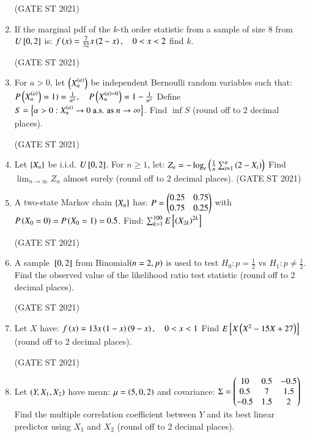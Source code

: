 \documentclass[journal,12pt,onecolumn]{IEEEtran}
\theoremstyle{remark}
\begin{document}
\begin{enumerate}
\hfill (GATE ST 2021) \\


\item
If the marginal pdf of the $k$-th order statistic from a sample of size 8 from $U{}\left[0,2\right]$ is:
$
f\left(x\right) = \frac{7}{32} x \left(2-x\right), \quad 0 < x < 2
$
find $k$.

\hfill (GATE ST 2021) \\

\item
For $a > 0$, let $\left( X_n^{\left(a\right)} \right)$ be independent Bernoulli random variables such that:
$
P\left(X_n^{\left(a\right)}\right) = 1) = \frac{1}{n^\alpha}, \quad P\left(X_n^{\left(a\right) = 0}\right) = 1 - \frac{1}{n^\alpha}
$
Define $S = \left\{ \alpha > 0 : X_n^{\left(a\right)} \to 0 \ \text{a.s. as} \ n \to \infty \right\}$.  
Find $\inf S$ (round off to 2 decimal places).

\hfill (GATE ST 2021) \\

\item
Let $\left\{X_n\right\}$ be i.i.d. $U{}\left[0,2\right]$. For $n \ge 1$, let:
$
Z_n = - \log_e \left( \frac{1}{n} \sum_{i=1}^n \left(2 - X_i\right) \right)
$
Find $\lim_{n \to \infty} Z_n$ almost surely (round off to 2 decimal places).
\hfill (GATE ST 2021) \\

\item
A two-state Markov chain $\left\{X_n\right\}$ has:
$
P = \begin{pmatrix} 0.25 & 0.75 \\ 0.75 & 0.25 \end{pmatrix}
$
with $P\left(X_0 = 0\right) = P\left(X_0 = 1\right) = 0.5$. Find:
$
\sum_{k=1}^{100} E{}\left[\left(X_{2k}\right)^{2k}\right]
$

\hfill (GATE ST 2021) \\

\item
A sample ${}\left[0,2\right]$ from Binomial$\left(n=2,p\right)$ is used to test $H_0: p = \frac12$ vs $H_1: p \ne \frac12$.  
Find the observed value of the likelihood ratio test statistic (round off to 2 decimal places).

\hfill (GATE ST 2021) \\

\item
Let $X$ have:
$
f\left(x\right) = 13x\left(1-x\right)\left(9-x\right), \quad 0 < x < 1
$
Find $E{}\left[ X\left(X^2 - 15X + 27\right)\right]$ (round off to 2 decimal places).

\hfill (GATE ST 2021) \\

\item
Let $\left(Y, X_1, X_2\right)$ have mean:
$
\mu = \left(5,0,2\right)
$
and covariance:
$
\Sigma =
\begin{pmatrix}
10 & 0.5 & -0.5 \\
0.5 & 7 & 1.5 \\
-0.5 & 1.5 & 2\end{pmatrix}
$
Find the multiple correlation coefficient between $Y$ and its best linear predictor using $X_1$ and $X_2$ (round off to 2 decimal places).


\end{enumerate}
\end{document}
